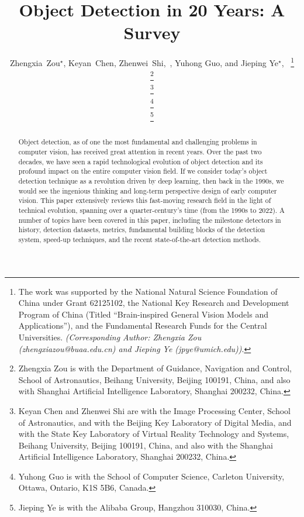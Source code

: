 \documentclass[lettersize,journal]{IEEEtran}
\begin{document}
\title{Object Detection in 20 Years: A Survey}

\author{Zhengxia~Zou$^\star$, Keyan~Chen, Zhenwei~Shi,~, Yuhong Guo, and Jieping Ye$^\star$,~
\thanks{The work was supported by the National Natural Science Foundation of China under Grant 62125102, the National Key Research and Development Program of China (Titled ``Brain-inspired General Vision Models and Applications''), and the Fundamental Research Funds for the Central Universities. \emph{(Corresponding Author: Zhengxia Zou (zhengxiazou@buaa.edu.cn) and Jieping Ye (jpye@umich.edu))}.}

\thanks{Zhengxia Zou is with the Department of Guidance, Navigation and Control, School of Astronautics, Beihang University, Beijing 100191, China, and also with Shanghai Artificial Intelligence Laboratory, Shanghai 200232, China.}

\thanks{Keyan Chen and Zhenwei Shi are with the Image Processing Center, School of Astronautics, and with the Beijing Key Laboratory of Digital Media, and with the State Key Laboratory of Virtual Reality Technology and Systems, Beihang University, Beijing 100191, China, and also with the Shanghai Artificial Intelligence Laboratory, Shanghai 200232, China.}

\thanks{Yuhong Guo is with the School of Computer Science, Carleton University, Ottawa, Ontario, K1S 5B6, Canada.}

\thanks{Jieping Ye is with the Alibaba Group, Hangzhou 310030, China.}
}


\maketitle

\begin{abstract}
Object detection, as of one the most fundamental and challenging problems in computer vision, has received great attention in recent years. Over the past two decades, we have seen a rapid technological evolution of object detection and its profound impact on the entire computer vision field. If we consider today's object detection technique as a revolution driven by deep learning, then back in the 1990s, we would see the ingenious thinking and long-term perspective design of early computer vision. This paper extensively reviews this fast-moving research field in the light of technical evolution, spanning over a quarter-century's time (from the 1990s to 2022). A number of topics have been covered in this paper, including the milestone detectors in history, detection datasets, metrics, fundamental building blocks of the detection system, speed-up techniques, and the recent state-of-the-art detection methods.
\end{abstract}
\end{document}
